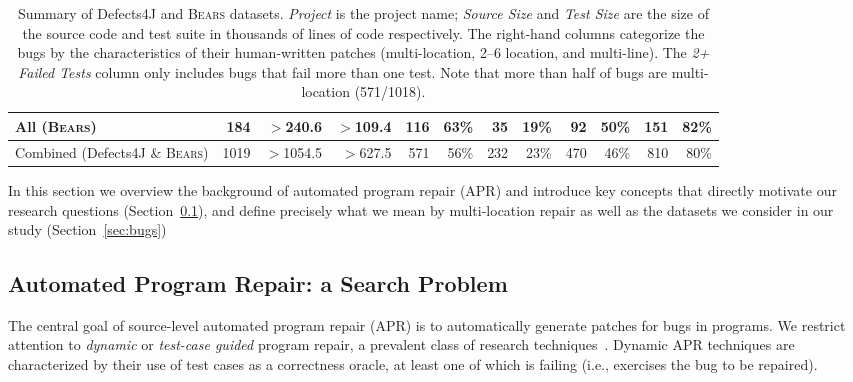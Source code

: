 \documentclass[10pt,journal,compsoc]{IEEEtran}
\newcommand\bears{\textsc{Bears}\xspace}
\begin{document}
\begin{table}
\begin{center}
\begin{tabular}{l  rrr | rr rr rr rr }
\midrule
All (\bears) & 184 & $>$240.6 & $>$109.4 & 116 & 63\% & 35 & 19\% & 92 & 50\% & 151 & 82\% \\
\midrule
Combined (Defects4J \& \bears) & 1019 & $>$1054.5 & $>$627.5 & 571 & 56\% & 232 & 23\% & 470 & 46\% & 810 & 80\%\\
\bottomrule
\end{tabular}
\end{center}
\caption{\label{tab:dataset-characteristics} \small Summary of Defects4J and \bears
  datasets. \emph{Project} is the project name; \emph{Source Size} and
  \emph{Test Size} are the size of the source code and test suite in thousands
  of lines of code respectively. The right-hand columns categorize the bugs by
  the characteristics of their human-written patches (multi-location, 2--6
  location, and multi-line). The \emph{2+ Failed Tests} column only includes
  bugs that fail more than one test. Note that more than half of bugs are
  multi-location (571/1018).  }
\end{table}

In this section we overview the background of automated program repair (APR) and
introduce key concepts that directly motivate our research questions
(Section~\ref{sec:apr}), and define precisely what we mean by multi-location
repair as well as the datasets we consider in our study (Section~\ref{sec:bugs})

\subsection{Automated Program Repair: a Search Problem}
\label{sec:apr}

The central goal of source-level automated program repair (APR) is to
automatically generate patches for bugs in programs. We restrict attention to
\emph{dynamic} or \emph{test-case guided} program repair, a prevalent class of
research techniques~\cite{cacm19}.  Dynamic APR techniques
are characterized by their use of test cases as a correctness oracle,
at least one of which is failing (i.e., exercises the bug
to be repaired).
\end{document}
